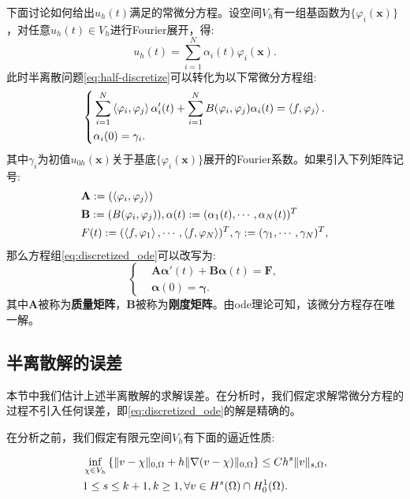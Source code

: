 下面讨论如何给出$u_{h}(t)$满足的常微分方程。设空间$V_{h}$有一组基函数为$\{\varphi_{i}(\mathbf{x})\}$，对任意$u_{h}(t)\in V_{h}$进行Fourier展开，得:
\begin{equation}
    \label{eq:FourierExpension}
    u_{h}(t)=\sum_{i=1}^{N}\alpha_{i}(t)\varphi_{i}(\mathbf{x}).
\end{equation}
此时半离散问题\eqref{eq:half-discretize}可以转化为以下常微分方程组:
\begin{equation}
    \label{eq:discretized_ode}
    \left\{
        \begin{aligned}
            &\sum_{i=1}^{N}\left<\varphi_{i},\varphi_{j}\right>\alpha_{i}'(t)+\sum_{i=1}^{N}B(\varphi_{i},\varphi_{j})\alpha_{i}(t)=\left<f,\varphi_{j}\right>.\\
            &\alpha_{i}(0)=\gamma_{i}.
        \end{aligned}
    \right.
\end{equation}
其中$\gamma_{i}$为初值$u_{0h}(\mathbf{x})$关于基底$\{\varphi_{i}(\mathbf{x})\}$展开的Fourier系数。如果引入下列矩阵记号:
\begin{equation}
    \begin{aligned}
        &\mathbf{A}:=(\left<\varphi_{i},\varphi_{j}\right>)\\
        &\mathbf{B}:=(B(\varphi_{i},\varphi_{j})),\mathbf{\alpha}(t):=(\alpha_{1}(t),\cdots,\alpha_{N}(t))^{T}\\
        &F(t):=(\left<f,\varphi_{1}\right>,\cdots,\left<f,\varphi_{N}\right>)^{T}, \mathbf{\gamma}:=(\gamma_{1},\cdots,\gamma_{N})^{T},
        \end{aligned}
\end{equation}
那么方程组\eqref{eq:discretized_ode}可以改写为:
\begin{equation}
    \left\{
        \begin{aligned}
            &\mathbf{A}\mathbf{\alpha}'(t)+\mathbf{B}\mathbf{\alpha}(t)=\mathbf{F},\\
            &\mathbf{\alpha}(0)=\mathbf{\gamma}.
        \end{aligned}
    \right.
\end{equation}
其中$\mathbf{A}$被称为\textbf{质量矩阵}，$\mathbf{B}$被称为\textbf{刚度矩阵}。由ode理论可知，该微分方程存在唯一解。
\subsection{半离散解的误差}
本节中我们估计上述半离散解的求解误差。在分析时，我们假定求解常微分方程的过程不引入任何误差，即\eqref{eq:discretized_ode}的解是精确的。

在分析之前，我们假定有限元空间$V_{h}$有下面的逼近性质:
\begin{proposition}
    \begin{equation}
        \begin{aligned}
            &\inf_{\chi\in V_{h}}\left\{\|v-\chi\|_{0,\Omega}+h\|\nabla(v-\chi)\|_{0,\Omega}\right\}\le Ch^{s}\|v\|_{s,\Omega},\\
            &1\le s\le k+1, k\ge 1, \forall v \in H^{s}(\Omega)\cap H_{0}^{1}(\Omega).
        \end{aligned}
    \end{equation}
\end{proposition}